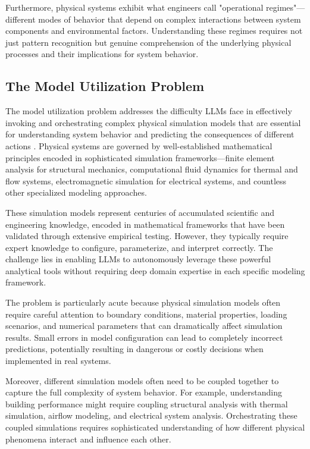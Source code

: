 Furthermore, physical systems exhibit what engineers call "operational regimes"—different modes of behavior that depend on complex interactions between system components and environmental factors. Understanding these regimes requires not just pattern recognition but genuine comprehension of the underlying physical processes and their implications for system behavior.

\subsection{The Model Utilization Problem}

The model utilization problem addresses the difficulty LLMs face in effectively invoking and orchestrating complex physical simulation models that are essential for understanding system behavior and predicting the consequences of different actions \cite{negri2017review, tao2019digital}. Physical systems are governed by well-established mathematical principles encoded in sophisticated simulation frameworks—finite element analysis for structural mechanics, computational fluid dynamics for thermal and flow systems, electromagnetic simulation for electrical systems, and countless other specialized modeling approaches.

These simulation models represent centuries of accumulated scientific and engineering knowledge, encoded in mathematical frameworks that have been validated through extensive empirical testing. However, they typically require expert knowledge to configure, parameterize, and interpret correctly. The challenge lies in enabling LLMs to autonomously leverage these powerful analytical tools without requiring deep domain expertise in each specific modeling framework.

The problem is particularly acute because physical simulation models often require careful attention to boundary conditions, material properties, loading scenarios, and numerical parameters that can dramatically affect simulation results. Small errors in model configuration can lead to completely incorrect predictions, potentially resulting in dangerous or costly decisions when implemented in real systems.

Moreover, different simulation models often need to be coupled together to capture the full complexity of system behavior. For example, understanding building performance might require coupling structural analysis with thermal simulation, airflow modeling, and electrical system analysis. Orchestrating these coupled simulations requires sophisticated understanding of how different physical phenomena interact and influence each other.

